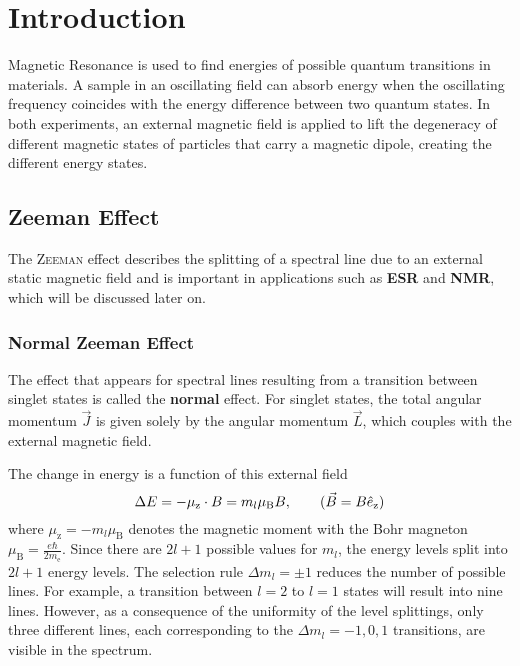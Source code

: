 \chapter{Introduction}
Magnetic Resonance is used to find energies of possible quantum transitions in materials.
A sample in an oscillating field can absorb energy when the oscillating frequency coincides with the energy difference between two quantum states. %
In both experiments, an external magnetic field is applied to lift the degeneracy of different magnetic states of particles that carry a magnetic dipole, creating the different energy states.

\section{Zeeman Effect}
The \textsc{Zeeman} effect describes the splitting of a spectral line due to an external static magnetic field and is important in applications such as \textbf{ESR} and \textbf{NMR}, which will be discussed later on.

\subsection{Normal Zeeman Effect}
The effect that appears for spectral lines resulting from a transition between singlet states is called the \textbf{normal} effect.
For singlet states, the total angular momentum $\vec{J}$ is given solely by the angular momentum $\vec{L}$, which couples with the external magnetic field.

The change in energy is a function of this external field
\begin{equation*}
	\Delta E = -\mu_\text{z}\cdot B=m_l\mu_\text{B}B, \tag{$\vec{B}=B\hat{e}_\text{z}$}
\end{equation*}
where $\mu_\text{z}=-m_l\mu_\text{B}$ denotes the magnetic moment with the Bohr magneton $\mu_\text{B}=\frac{e\hbar}{2m_\text{e}}$.
Since there are $2l+1$ possible values for $m_l$, the energy levels split into $2l+1$ energy levels.
The selection rule $\Delta m_l=\pm 1$ reduces the number of possible lines.
For example, a transition between $l=2$ to $l=1$ states will result into nine lines.
However, as a consequence of the uniformity of the level splittings, only three different lines, each corresponding to the $\Delta m_l=-1,0,1$ transitions, are visible in the spectrum.

